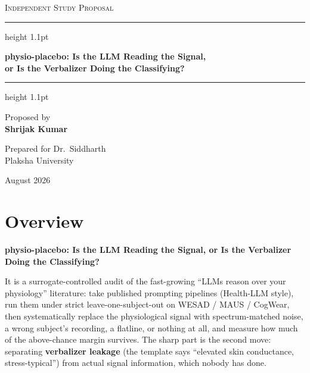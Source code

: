 \documentclass[11pt]{article}
\begin{document}
\begin{titlepage}
  \centering
  \vspace*{2.2cm}
  {\large\scshape\color{AccentSoft} Independent Study Proposal\par}
  \vspace{1.2cm}
  {\color{Accent}\hrule height 1.1pt}
  \vspace{1.0cm}
  {\LARGE\bfseries\color{Accent} physio-placebo: Is the LLM Reading the Signal,\\[4pt]
   or Is the Verbalizer Doing the Classifying?\par}
  \vspace{1.0cm}
  {\color{Accent}\hrule height 1.1pt}
  \vspace{1.6cm}
  {\large Proposed by\\[2pt]\textbf{\color{Accent} Shrijak Kumar}\par}
  \vspace{1.1cm}
  {\large Prepared for Dr.\ Siddharth\\[3pt] Plaksha University\par}
  \vspace{0.6cm}
  {\large\color{AccentSoft} August 2026\par}
  \vfill
\end{titlepage}

\section{Overview}

\textbf{physio-placebo: Is the LLM Reading the Signal, or Is the Verbalizer
Doing the Classifying?}

It is a surrogate-controlled audit of the fast-growing ``LLMs reason over your
physiology'' literature: take published prompting pipelines (Health-LLM style),
run them under strict leave-one-subject-out on WESAD / MAUS / CogWear, then
systematically replace the physiological signal with spectrum-matched noise,
a wrong subject's recording, a flatline, or nothing at all, and measure how
much of the above-chance margin survives. The sharp part is the second move:
separating \textbf{verbalizer leakage} (the template says ``elevated skin
conductance, stress-typical'') from actual signal information, which nobody
has done.
\end{document}
